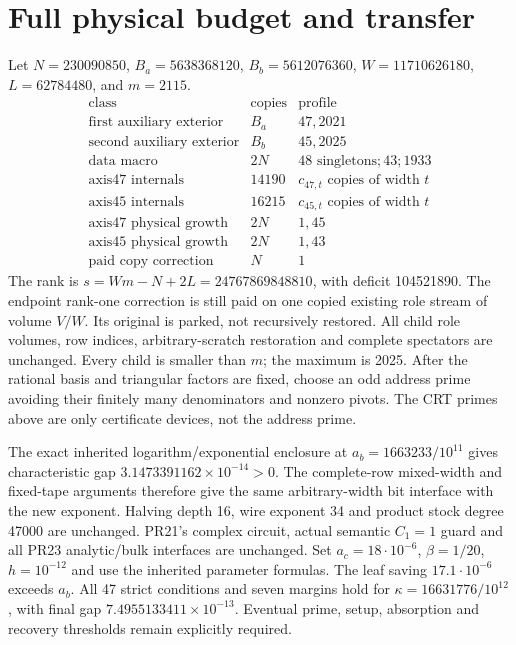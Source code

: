 \documentclass[11pt]{article}
\begin{document}
\section{Full physical budget and transfer}
Let $N=230090850$, $B_a=5638368120$, $B_b=5612076360$,
$W=11710626180$, $L=62784480$, and $m=2115$.
\[
\begin{array}{l|r|l}
\text{class}&\text{copies}&\text{profile}\\\hline
\text{first auxiliary exterior}&B_a&47,2021\\
\text{second auxiliary exterior}&B_b&45,2025\\
\text{data macro}&2N&48\text{ singletons};43;1933\\
\text{axis47 internals}&14190&c_{47,t}\text{ copies of width }t\\
\text{axis45 internals}&16215&c_{45,t}\text{ copies of width }t\\
\text{axis47 physical growth}&2N&1,45\\
\text{axis45 physical growth}&2N&1,43\\
\text{paid copy correction}&N&1
\end{array}
\]
The rank is $s=Wm-N+2L=24767869848810$, with deficit 104521890.
The endpoint rank-one correction is still paid on one copied existing role
stream of volume $V/W$. Its original is parked, not recursively restored.
All child role volumes, row indices, arbitrary-scratch restoration and complete
spectators are unchanged. Every child is smaller than $m$; the maximum is 2025.
After the rational basis and triangular factors are fixed, choose an odd
address prime avoiding their finitely many denominators and nonzero pivots.
The CRT primes above are only certificate devices, not the address prime.

The exact inherited logarithm/exponential enclosure at
$a_b=1663233/10^{11}$ gives characteristic gap
$3.1473391162\times10^{-14}>0$. The complete-row mixed-width and fixed-tape
arguments therefore give the same arbitrary-width bit interface with the new
exponent. Halving depth 16, wire exponent 34 and product stock degree 47000
are unchanged. PR21's complex circuit, actual semantic $C_1=1$ guard and all
PR23 analytic/bulk interfaces are unchanged. Set $a_c=18\cdot10^{-6}$,
$\beta=1/20$, $h=10^{-12}$ and use the inherited parameter formulas.
The leaf saving $17.1\cdot10^{-6}$ exceeds $a_b$. All 47 strict conditions
and seven margins hold for $\kappa=16631776/10^{12}$, with final gap
$7.4955133411\times10^{-13}$. Eventual prime, setup, absorption and recovery
thresholds remain explicitly required.
\end{document}
